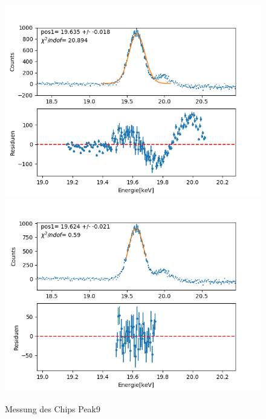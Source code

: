 \documentclass[12pt,a4paper]{article}
\begin{document}
\begin{figure}[H]
\centering
\includegraphics[scale=0.49]{Bilder/roentgen_spektren/chip/chip9_1.png}
\includegraphics[scale=0.49]{Bilder/roentgen_spektren/chip/chip9_2.png}
\caption{Messung des Chips Peak9}
\end{figure}
\end{document}
